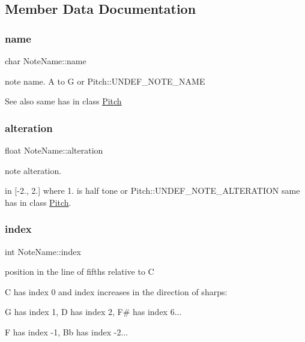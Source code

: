 \subsection{Member Data Documentation}
\mbox{\label{structNoteName_acd97c2eed21a588fb362e3838183c2d9}} 
\subsubsection{\texorpdfstring{name}{name}}
{\footnotesize\ttfamily char Note\+Name\+::name}



note name. \textquotesingle{}A\textquotesingle{} to \textquotesingle{}G\textquotesingle{} or Pitch\+::\+U\+N\+D\+E\+F\+\_\+\+N\+O\+T\+E\+\_\+\+N\+A\+ME 

\begin{DoxySeeAlso}{See also}
same has in class \mbox{\hyperlink{classPitch}{Pitch}} 
\end{DoxySeeAlso}
\mbox{\label{structNoteName_a6b6ddfa2befdb91e8f2a283569efe579}} 
\subsubsection{\texorpdfstring{alteration}{alteration}}
{\footnotesize\ttfamily float Note\+Name\+::alteration}



note alteration. 

in \mbox{[}-\/2., 2.\mbox{]} where 1. is half tone or Pitch\+::\+U\+N\+D\+E\+F\+\_\+\+N\+O\+T\+E\+\_\+\+A\+L\+T\+E\+R\+A\+T\+I\+ON same has in class \mbox{\hyperlink{classPitch}{Pitch}}. \mbox{\label{structNoteName_adf37d714ab36d4769052e4145873fe29}} 
\subsubsection{\texorpdfstring{index}{index}}
{\footnotesize\ttfamily int Note\+Name\+::index}



position in the line of fifths relative to C 


\begin{DoxyItemize}
\item C has index 0 and index increases in the direction of sharps\+:
\item G has index 1, D has index 2, F\# has index 6...
\item F has index -\/1, Bb has index -\/2...
\end{DoxyItemize}

